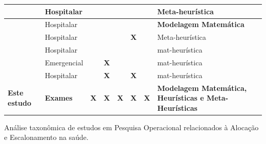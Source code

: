 \begin{quadro}[h]
{\begin{footnotesize}
\begin{tabular}{|M{2cm}|M{2cm}|M{1.5cm}|M{1.5cm}|M{1.5cm}|M{1.5cm}|M{1.8cm}|M{3cm}| }
				\hline
				                                        & Hospitalar           &                                &                              &            &            &            & Meta-heurística                                               \\
				\hline
				                                   & Hospitalar           &                                &                              &            &            &            & \textbf{Modelagem Matemática}                                \\
				\hline
				                                          & Hospitalar           &                                &                              &            & \textbf{X} &            & Meta-heurística                                               \\
				\hline
				                           & Hospitalar           &                                &                              &            &            &            & mat-heurística                                                \\
				\hline
				                                & Emergencial          &                                & \textbf{X}                   &            &            &            & mat-heurística                                                \\
				\hline
				                  & Hospitalar           &                                & \textbf{X}                   &            & \textbf{X} &            & mat-heurística                                                \\
				\hline
				\textbf{Este estudo}                                                   & \textbf{Exames}   & \textbf{X}                     & \textbf{X}                   & \textbf{X} & \textbf{X} & \textbf{X} & \textbf{Modelagem Matemática, Heurísticas e Meta-Heurísticas} \\
				\hline
			\end{tabular}
		\end{footnotesize}}
	\caption{Análise taxonômica de estudos em Pesquisa Operacional relacionados à Alocação e Escalonamento na saúde.}
	\fautor
	\label{tab:taxonomia-estudos}
\end{quadro}